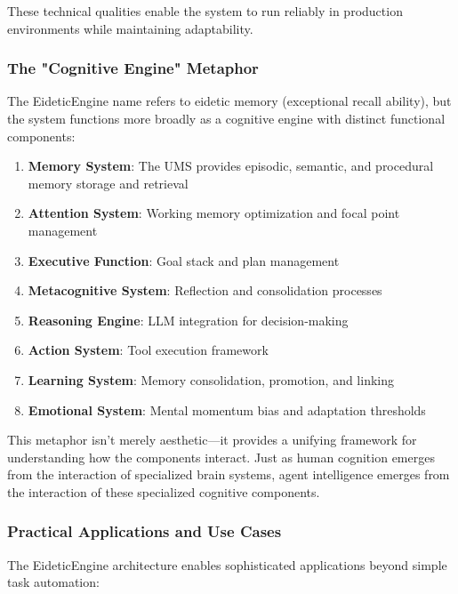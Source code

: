 \documentclass[12pt,a4paper]{article}
\begin{document}
These technical qualities enable the system to run reliably in production environments while maintaining adaptability.

\subsubsection*{The "Cognitive Engine" Metaphor}

The EideticEngine name refers to eidetic memory (exceptional recall ability), but the system functions more broadly as a cognitive engine with distinct functional components:

\begin{enumerate}[label=\arabic*.]
    \item \textbf{Memory System}: The UMS provides episodic, semantic, and procedural memory storage and retrieval
    \item \textbf{Attention System}: Working memory optimization and focal point management
    \item \textbf{Executive Function}: Goal stack and plan management
    \item \textbf{Metacognitive System}: Reflection and consolidation processes
    \item \textbf{Reasoning Engine}: LLM integration for decision-making
    \item \textbf{Action System}: Tool execution framework
    \item \textbf{Learning System}: Memory consolidation, promotion, and linking
    \item \textbf{Emotional System}: Mental momentum bias and adaptation thresholds
\end{enumerate}

This metaphor isn't merely aesthetic—it provides a unifying framework for understanding how the components interact. Just as human cognition emerges from the interaction of specialized brain systems, agent intelligence emerges from the interaction of these specialized cognitive components.

\subsubsection*{Practical Applications and Use Cases}

The EideticEngine architecture enables sophisticated applications beyond simple task automation:
\end{document}
